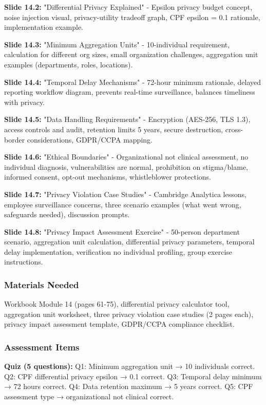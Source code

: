 \documentclass[11pt,a4paper]{article}
\begin{document}
\textbf{Slide 14.2:} "Differential Privacy Explained" - Epsilon privacy budget concept, noise injection visual, privacy-utility tradeoff graph, CPF epsilon = 0.1 rationale, implementation example.

\textbf{Slide 14.3:} "Minimum Aggregation Units" - 10-individual requirement, calculation for different org sizes, small organization challenges, aggregation unit examples (departments, roles, locations).

\textbf{Slide 14.4:} "Temporal Delay Mechanisms" - 72-hour minimum rationale, delayed reporting workflow diagram, prevents real-time surveillance, balances timeliness with privacy.

\textbf{Slide 14.5:} "Data Handling Requirements" - Encryption (AES-256, TLS 1.3), access controls and audit, retention limits 5 years, secure destruction, cross-border considerations, GDPR/CCPA mapping.

\textbf{Slide 14.6:} "Ethical Boundaries" - Organizational not clinical assessment, no individual diagnosis, vulnerabilities are normal, prohibition on stigma/blame, informed consent, opt-out mechanisms, whistleblower protections.

\textbf{Slide 14.7:} "Privacy Violation Case Studies" - Cambridge Analytica lessons, employee surveillance concerns, three scenario examples (what went wrong, safeguards needed), discussion prompts.

\textbf{Slide 14.8:} "Privacy Impact Assessment Exercise" - 50-person department scenario, aggregation unit calculation, differential privacy parameters, temporal delay implementation, verification no individual profiling, group exercise instructions.

\subsubsection{Materials Needed}
Workbook Module 14 (pages 61-75), differential privacy calculator tool, aggregation unit worksheet, three privacy violation case studies (2 pages each), privacy impact assessment template, GDPR/CCPA compliance checklist.

\subsubsection{Assessment Items}
\textbf{Quiz (5 questions):} Q1: Minimum aggregation unit → 10 individuals correct. Q2: CPF differential privacy epsilon → 0.1 correct. Q3: Temporal delay minimum → 72 hours correct. Q4: Data retention maximum → 5 years correct. Q5: CPF assessment type → organizational not clinical correct.
\end{document}
